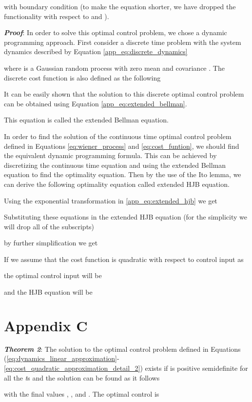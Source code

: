 \documentclass[letterpaper, 10 pt, conference]{ieeeconf}
\begin{document}
with boundary condition  (to make the equation
shorter, we have dropped the functionality with respect to  and ).

\textbf{\textit{{Proof}}}: 
In order to solve this optimal control problem, we chose a dynamic programming
approach. First consider a discrete time problem with the system dynamics
described by Equation \eqref{app_eq:discrete_dynamics}

where  is a Gaussian random process with zero mean and covariance
. The discrete cost function is
also defined as the following

It can be easily shown that the solution to this discrete optimal control problem
can be obtained using Equation \eqref{app_eq:extended_bellman}.

This equation is called the extended Bellman equation. 

In order to find the solution of the continuous time optimal control problem
defined in Equations \eqref{eq:wiener_process} and \eqref{eq:cost_funtion}, we
should find the equivalent dynamic programming formula. This can be achieved by
discretizing the continuous time equation and using the extended Bellman equation
to find the optimality equation. Then by the use of the Ito lemma, we can derive the
following optimality equation called extended HJB equation.

Using the exponential transformation  in \eqref{app_eq:extended_hjb} we get

Substituting these equations in the extended HJB equation (for the simplicity we
will drop all of the subscripts)

by further simplification we get

If we assume that the cost function is quadratic with respect to control input
 as

the optimal control input will be

and the HJB equation will be



\section{Appendix C}
\textbf{\textit{Theorem 2}}: 
The solution to the optimal control problem defined in Equations\!
(\ref{eq:dynamics_linear_approximation}-\ref{eq:cost_quadratic_approximation_detail_2}) exists if  is positive semidefinite for all the \textit{t}s and the solution can be found as it follows

with the final values , , and . The optimal control is
\end{document}
